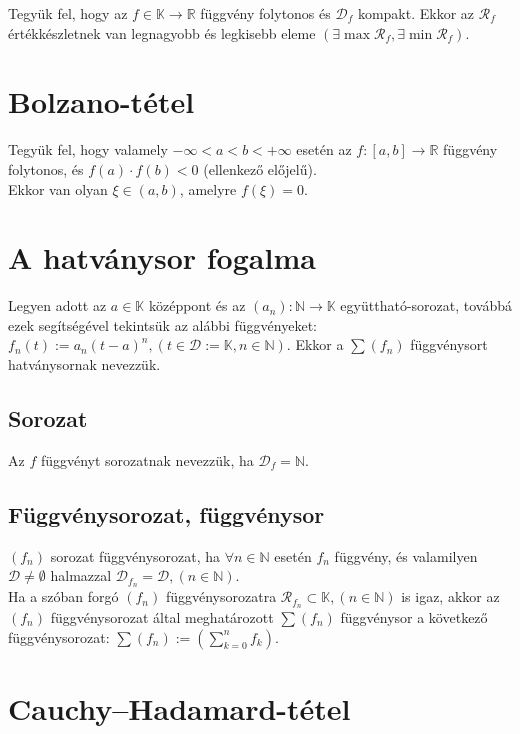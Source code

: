 \documentclass[margin=0px]{article}
\begin{document}
	Tegyük fel, hogy az $f \in \mathbb{K} \to \mathbb{R}$ függvény folytonos és $\mathcal{D}_{f}$ kompakt. Ekkor az $\mathcal{R}_{f}$ értékkészletnek van legnagyobb és legkisebb eleme $(\exists \max{\mathcal{R}_{f}}, \exists \min{\mathcal{R}_{f}})$.
	
	\section{Bolzano-tétel}
	
	Tegyük fel, hogy valamely $-\infty < a < b < +\infty$ esetén az $f:[a,b] \to \mathbb{R}$ függvény folytonos, és $f(a) \cdot f(b) < 0$ (ellenkező előjelű). \\
	Ekkor van olyan $\xi \in (a,b)$, amelyre $f(\xi) = 0$.
	
	\section{A hatványsor fogalma}
	
	Legyen adott az $a \in \mathbb{K}$ középpont és az $(a_{n}): \mathbb{N} \to \mathbb{K}$ együttható-sorozat, továbbá ezek segítségével tekintsük az alábbi függvényeket: $f_{n}(t) := a_{n}(t-a)^{n}, (t \in \mathcal{D} := \mathbb{K}, n \in \mathbb{N})$. Ekkor a $\sum{(f_{n})}$ függvénysort hatványsornak nevezzük.
	
	\subsection{Sorozat}
	
	Az $f$ függvényt sorozatnak nevezzük, ha $\mathcal{D}_{f} = \mathbb{N}$.
	
	\subsection{Függvénysorozat, függvénysor}
	
	$(f_{n})$ sorozat függvénysorozat, ha $\forall n \in \mathbb{N}$ esetén $f_{n}$ függvény, és valamilyen $\mathcal{D} \neq \emptyset$ halmazzal $\mathcal{D}_{f_{n}} = \mathcal{D}, (n \in \mathbb{N})$. \\
	Ha a szóban forgó $(f_{n})$ függvénysorozatra $\mathcal{R}_{f_{n}} \subset \mathbb{K}, (n \in \mathbb{N})$ is igaz, akkor az $(f_{n})$ függvénysorozat által meghatározott $\sum{(f_{n})}$ függvénysor a következő függvénysorozat: $\sum{(f_{n})} := (\sum\limits_{k=0}^{n}{f_{k}})$.
	
	\section{Cauchy--Hadamard-tétel}
	
\end{document}
